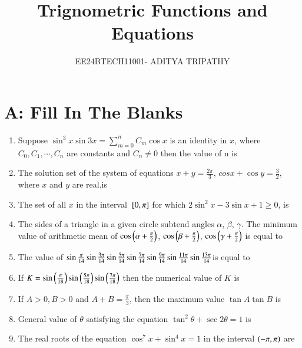 \documentclass[journal,12pt,twocolumn]{IEEEtran}
\title{Trignometric Functions and Equations}
\author{EE24BTECH11001- ADITYA TRIPATHY}
\theoremstyle{remark}
\begin{document}
\maketitle

\section*{\textbf{A: Fill In The Blanks}}


\begin{enumerate}
	


	 
	\item Suppose $\sin^3{x}\sin3x = \sum_{m=0}^{n} C_m \cos x $ is an identity in $x$, where $C_0, C_1, \cdots , C_n$ are constants and $C_n \neq 0$ then the value of n is
		\hfill{}


	\item The solution set of the system of equations $x + y = \frac{2\pi}{3}$, $cos x + \cos y = \frac{3}{2}$, where $x$ and $y$ are real,is 
		\hfill{}
	\item The set of all $x$ in the interval ${}\left[0,\pi\right]$ for which $2 \sin^2 x -3\sin x +1 \ge 0$, is 
	
		\hfill{}
  
  
	
	\item The sides of a triangle in a given circle subtend angles $\alpha$, $\beta$, $\gamma$. The minimum value of arithmetic mean of $\cos \left(\alpha + \frac{\pi}{2}\right)$, $\cos \left(\beta + \frac{\pi}{2}\right)$, $\cos \left(\gamma + \frac{\pi}{2}\right)$ is equal to 
			\hfill{}
  
	

	\item The value of
	$\sin\frac{\pi}{14}\sin\frac{3\pi}{14}\sin\frac{5\pi}{14}\sin\frac{7\pi}{14}
		\\ \sin\frac{9\pi}{14}\sin\frac{11\pi}{14}\sin\frac{13\pi}{14} $is equal to  
		
			\hfill{}
  
  
	
		\item If $K = \sin\left(\frac{\pi}{18}\right)\sin\left(\frac{5\pi}{18}\right)\sin\left(\frac{7\pi}{18}\right)$ then the numerical value of $K$ is  
		\hfill{}
  
  
	
	\item If $A > 0, B>0$ and $A + B = \frac{\pi}{3}$, then the maximum value $\tan A \tan B$ is  
		\hfill{}
  
	

	\item General value of $\theta$ satisfying the equation $\tan^{2}\theta +\sec2\theta = 1$ is 
		\hfill{}
  
	

	\item The real roots of the equation $\cos^{7}x + \sin^{4}x = 1$ in the interval $\left(-\pi,\pi\right)$ are 
		\hfill{}



\end{enumerate}  
\end{document}
